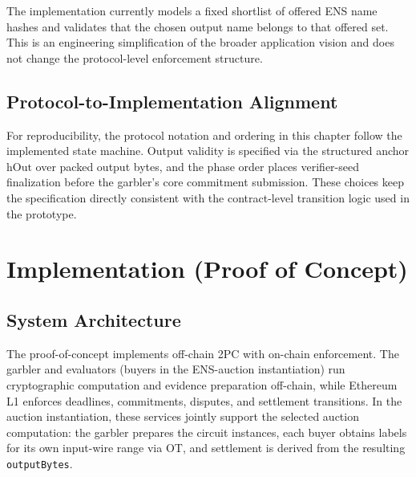 \documentclass[final,twoside]{vutinfth}
\begin{document}
The implementation currently models a fixed shortlist of offered ENS name hashes
and validates that the chosen output name belongs to that offered set. This is
an engineering simplification of the broader application vision and does not
change the protocol-level enforcement structure.

\section{Protocol-to-Implementation Alignment}
For reproducibility, the protocol notation and ordering in this chapter follow
the implemented state machine.
Output validity is specified via the structured anchor
$\mathrm{hOut}$ over packed output bytes, and the phase order places
verifier-seed finalization before the garbler's core commitment submission.
These choices keep the specification directly consistent with the contract-level
transition logic used in the prototype.

\chapter{Implementation (Proof of Concept)}
\section{System Architecture}
The proof-of-concept implements off-chain 2PC with on-chain enforcement.
The garbler and evaluators (buyers in the ENS-auction instantiation) run
cryptographic computation and evidence preparation off-chain, while Ethereum L1
enforces deadlines, commitments, disputes, and settlement transitions.
In the auction instantiation, these services jointly support the selected
auction computation: the garbler prepares the circuit instances, each buyer
obtains labels for its own input-wire range via OT, and settlement is derived
from the resulting \texttt{outputBytes}.
\end{document}
